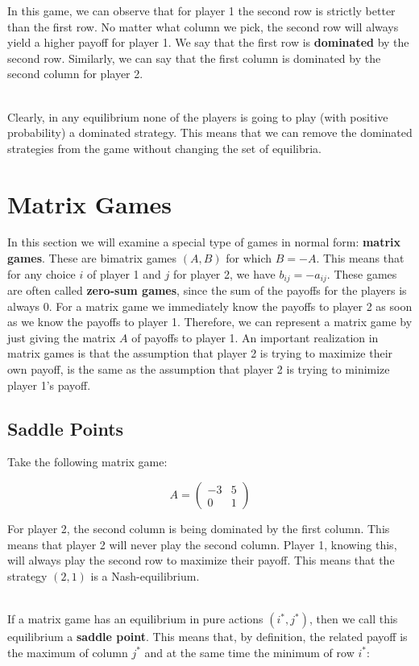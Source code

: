 \documentclass[12pt]{article}
\begin{document}
\noindent
In this game, we can observe that for player 1 the second row is strictly better than the first row.
No matter what column we pick, the second row will always yield a higher payoff for player 1.
We say that the first row is \textbf{dominated} by the second row.
Similarly, we can say that the first column is dominated by the second column for player 2.

\noindent
\\
Clearly, in any equilibrium none of the players is going to play (with positive probability) a dominated strategy.
This means that we can remove the dominated strategies from the game without changing the set of equilibria.

%
%
\newpage
\section{Matrix Games}
In this section we will examine a special type of games in normal form: \textbf{matrix games}.
These are bimatrix games $(A, B)$ for which $B = -A$.
This means that for any choice $i$ of player 1 and $j$ for player 2, we have $b_{ij} = -a_{ij}$.
These games are often called \textbf{zero-sum games}, since the sum of the payoffs for the players is always 0.
For a matrix game we immediately know the payoffs to player 2 as soon as we know the payoffs to player 1.
Therefore, we can represent a matrix game by just giving the matrix $A$ of payoffs to player 1.
An important realization in matrix games is that the assumption that player 2 is trying to maximize their own payoff, is the same as the assumption that player 2 is trying to minimize player 1's payoff.

\subsection{Saddle Points}
Take the following matrix game:

\[ A = \begin{pmatrix}
    -3 & 5 \\
    0 & 1
\end{pmatrix} \]

\noindent
For player 2, the second column is being dominated by the first column.
This means that player 2 will never play the second column.
Player 1, knowing this, will always play the second row to maximize their payoff.
This means that the strategy $(2, 1)$ is a Nash-equilibrium.

\noindent
\\
If a matrix game has an equilibrium in pure actions $(i^*, j^*)$, then we call this equilibrium a \textbf{saddle point}.
This means that, by definition, the related payoff is the maximum of column $j^*$ and at the same time the minimum of row $i^*$:
\end{document}
